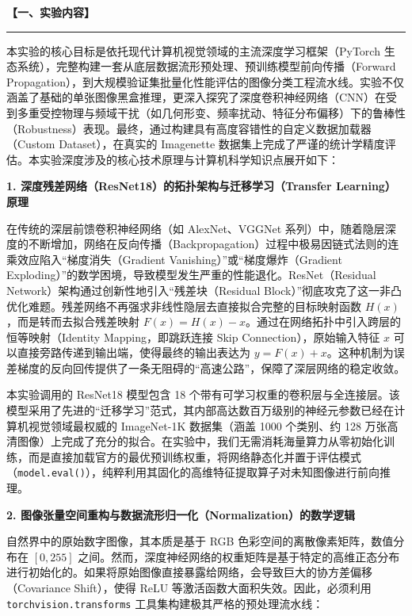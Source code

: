 \documentclass[a4paper,12pt]{article}
\newenvironment{sectionbox}[1]
{%
    \begin{center}
    \fboxrule=1pt
    \fboxsep=8pt
    \begin{minipage}{0.98\textwidth}
    \textbf{#1}
    \par\vspace{4pt}
    \hrule
    \vspace{6pt}
}
{%
    \end{minipage}
    \end{center}
}
\begin{document}
\begin{sectionbox}{【一、实验内容】}


本实验的核心目标是依托现代计算机视觉领域的主流深度学习框架（PyTorch 生态系统），完整构建一套从底层数据流形预处理、预训练模型前向传播（Forward Propagation），到大规模验证集批量化性能评估的图像分类工程流水线。实验不仅涵盖了基础的单张图像黑盒推理，更深入探究了深度卷积神经网络（CNN）在受到多重受控物理与频域干扰（如几何形变、频率扰动、特征分布偏移）下的鲁棒性（Robustness）表现。最终，通过构建具有高度容错性的自定义数据加载器（Custom Dataset），在真实的 Imagenette 数据集上完成了严谨的统计学精度评估。本实验深度涉及的核心技术原理与计算机科学知识点展开如下：

\vspace{4pt}
\textbf{1. 深度残差网络（ResNet18）的拓扑架构与迁移学习（Transfer Learning）原理}

在传统的深层前馈卷积神经网络（如 AlexNet、VGGNet 系列）中，随着隐层深度的不断增加，网络在反向传播（Backpropagation）过程中极易因链式法则的连乘效应陷入“梯度消失（Gradient Vanishing）”或“梯度爆炸（Gradient Exploding）”的数学困境，导致模型发生严重的性能退化。ResNet（Residual Network）架构通过创新性地引入“残差块（Residual Block）”彻底攻克了这一非凸优化难题。残差网络不再强求非线性隐层去直接拟合完整的目标映射函数 $H(x)$，而是转而去拟合残差映射 $F(x) = H(x) - x$。通过在网络拓扑中引入跨层的恒等映射（Identity Mapping，即跳跃连接 Skip Connection），原始输入特征 $x$ 可以直接旁路传递到输出端，使得最终的输出表达为 $y = F(x) + x$。这种机制为误差梯度的反向回传提供了一条无阻碍的“高速公路”，保障了深层网络的稳定收敛。

本实验调用的 ResNet18 模型包含 18 个带有可学习权重的卷积层与全连接层。该模型采用了先进的“迁移学习”范式，其内部高达数百万级别的神经元参数已经在计算机视觉领域最权威的 ImageNet-1K 数据集（涵盖 1000 个类别、约 128 万张高清图像）上完成了充分的拟合。在实验中，我们无需消耗海量算力从零初始化训练，而是直接加载官方的最优预训练权重，将网络静态化并置于评估模式（\texttt{model.eval()}），纯粹利用其固化的高维特征提取算子对未知图像进行前向推理。

\vspace{4pt}
\textbf{2. 图像张量空间重构与数据流形归一化（Normalization）的数学逻辑}

自然界中的原始数字图像，其本质是基于 RGB 色彩空间的离散像素矩阵，数值分布在 $[0, 255]$ 之间。然而，深度神经网络的权重矩阵是基于特定的高维正态分布进行初始化的。如果将原始图像直接暴露给网络，会导致巨大的协方差偏移（Covariance Shift），使得 ReLU 等激活函数大面积失效。因此，必须利用 \texttt{torchvision.transforms} 工具集构建极其严格的预处理流水线：


\end{sectionbox}
\end{document}
